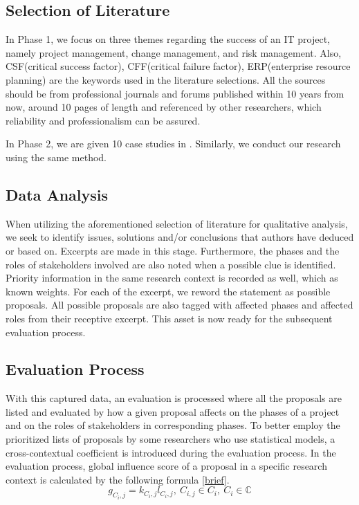 \subsection{Selection of Literature}
In Phase 1, we focus on three themes regarding the success of an IT project, namely project management, change management, and risk management. Also, CSF(critical success factor), CFF(critical failure factor), ERP(enterprise resource planning) are the keywords used in the literature selections. All the sources should be from professional journals and forums published within 10 years from now, around 10 pages of length and referenced by other researchers, which reliability and professionalism can be assured.

In Phase 2, we are given 10 case studies in . Similarly, we conduct our research using the same method.

\subsection{Data Analysis}
When utilizing the aforementioned selection of literature for qualitative analysis, we seek to identify issues, solutions and/or conclusions that authors have deduced or based on. Excerpts are made in this stage. Furthermore, the phases and the roles of stakeholders involved are also noted when a possible clue is identified. Priority information in the same research context is recorded as well, which as known weights. For each of the excerpt, we reword the statement as possible proposals. All possible proposals are also tagged with affected phases and affected roles from their receptive excerpt. This asset is now ready for the subsequent evaluation process.

\subsection{Evaluation Process}
With this captured data, an evaluation is processed where all the proposals are listed and evaluated by how a given proposal affects on the phases of a project and on the roles of stakeholders in corresponding phases. To better employ the prioritized lists of proposals by some researchers who use statistical models, a cross-contextual coefficient is introduced during the evaluation process. In the evaluation process, global influence score of a proposal in a specific research context is calculated by the following formula \ref{brief}.
\begin{equation}
g_{C_{i},j} = \mathit{k_{C_{i},j}}l_{C_{i},j},\ C_{i,j} \in C_{i},\ C_{i} \in \mathbb{C}
\label{brief}
\end{equation}

